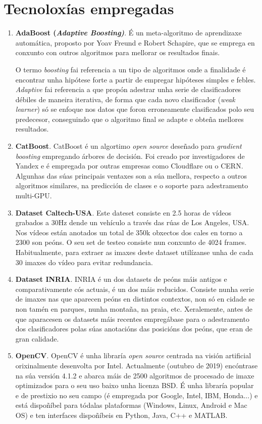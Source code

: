 \documentclass[galician]{./head/uvigo-tfg}
\begin{document}
    \section{Tecnoloxías empregadas}
    \begin{enumerate}
        \item \textbf{AdaBoost (\textit{Adaptive Boosting)}}\cite{freund1997decision}. É un meta-algoritmo de aprendizaxe automática, proposto por Yoav Freund e Robert Schapire, que se emprega en conxunto con outros algoritmos para mellorar os resultados finais.
        \par O termo \textit{boosting} fai referencia a un tipo de algoritmos onde a finalidade é encontrar unha hipótese forte a partir de empregar hipóteses simples e febles. \textit{Adaptive} fai referencia a que propón adestrar unha serie de clasificadores débiles de maneira iterativa,  de forma que cada novo clasificador (\textit{weak learner}) só se enfoque nos datos que foron erroneamente clasificados polo seu predecesor, conseguindo que o algoritmo final se adapte e obteña mellores resultados.
        \item \textbf{CatBoost}\cite{CatBoost}. CatBoost é un algortimo \textit{open source} deseñado para \textit{gradient boosting} empregando árbores de decisión. Foi creado por investigadores de Yandex e é empregada por outras empresas como Cloudflare ou o CERN. Algunhas das súas principais ventaxes son a súa mellora, respecto a outros algoritmos similares, na predicción de clases e o soporte para adestramento multi-GPU.
        \item \textbf{Dataset Caltech-USA}\cite{caltech}. Este dateset consiste en 2.5 horas de vídeos grabados a 30Hz dende un vehículo a través das rúas de Los Angeles, USA. Nos vídeos están anotados un total de 350k obxectos dos cales en torno a 2300 son peóns. O seu set de testeo consiste nun conxunto de 4024 frames. Habitualmente, para extraer as imaxes deste dataset utilízanse unha de cada 30 imaxes do vídeo para evitar redundancia.
        \item \textbf{Dataset INRIA}\cite{inria}. INRIA é un dos datasets de peóns máis antigos e comparativamente cós actuais, é un dos máis reducidos. Consiste nunha serie de imaxes nas que aparecen peóns en distintos contextos, non só en cidade se non tamén en parques, nunha montaña, na praia, etc. Xeralemente, antes de que aparacesen os datasets máis recentes empregábase para o adestramento dos clasificadores polas súas anotacións das posicións dos peóns, que eran de gran calidade.
        \item \textbf{OpenCV}\cite{opencv_library}. OpenCV é unha libraría \textit{open source} centrada na visión artificial orixinalmente desenvolta por Intel. Actualmente (outubro de 2019) encóntrase na súa versión 4.1.2 e abarca máis de 2500 algoritmos de procesado de imaxe optimizados para o seu uso baixo unha licenza BSD. É unha libraría popular e de prestixio no seu campo (é empregada por Google, Intel, IBM, Honda...) e está dispoñíbel para tódalas plataformas (Windows, Linux, Android e Mac OS) e ten interfaces dispoñíbeis en Python, Java, C++ e MATLAB.

\end{enumerate}
\end{document}
